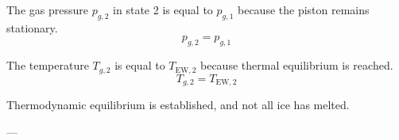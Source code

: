 The gas pressure \( p_{g,2} \) in state 2 is equal to \( p_{g,1} \) because the piston remains stationary.  
\[
p_{g,2} = p_{g,1}
\]  

The temperature \( T_{g,2} \) is equal to \( T_{\text{EW},2} \) because thermal equilibrium is reached.  
\[
T_{g,2} = T_{\text{EW},2}
\]  

Thermodynamic equilibrium is established, and not all ice has melted.  

---